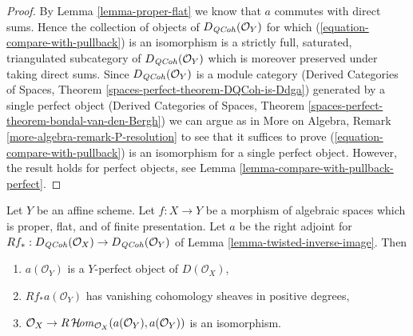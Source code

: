 \begin{proof}
By Lemma \ref{lemma-proper-flat} we know that $a$ commutes
with direct sums. Hence the collection of objects of
$D_{\mathit{QCoh}}(\mathcal{O}_Y)$ for which (\ref{equation-compare-with-pullback})
is an isomorphism is a strictly full, saturated, triangulated
subcategory of $D_{\mathit{QCoh}}(\mathcal{O}_Y)$ which is moreover
preserved under taking direct sums. Since $D_{\mathit{QCoh}}(\mathcal{O}_Y)$
is a module category (Derived Categories of Spaces, Theorem
\ref{spaces-perfect-theorem-DQCoh-is-Ddga}) generated by a single
perfect object (Derived Categories of Spaces, Theorem
\ref{spaces-perfect-theorem-bondal-van-den-Bergh})
we can argue as in
More on Algebra, Remark \ref{more-algebra-remark-P-resolution}
to see that it suffices to prove (\ref{equation-compare-with-pullback})
is an isomorphism for a single perfect object.
However, the result holds for perfect objects, see
Lemma \ref{lemma-compare-with-pullback-perfect}.
\end{proof}

\begin{lemma}
\label{lemma-properties-relative-dualizing}
Let $Y$ be an affine scheme. Let $f : X \to Y$ be a morphism of
algebraic spaces which is proper, flat, and of finite presentation.
Let $a$ be the right adjoint for
$Rf_* : D_{\mathit{QCoh}}(\mathcal{O}_X) \to D_{\mathit{QCoh}}(\mathcal{O}_Y)$ of
Lemma \ref{lemma-twisted-inverse-image}.
Then
\begin{enumerate}
\item $a(\mathcal{O}_Y)$ is a $Y$-perfect object of $D(\mathcal{O}_X)$,
\item $Rf_*a(\mathcal{O}_Y)$ has vanishing cohomology sheaves
in positive degrees,
\item $\mathcal{O}_X \to
R\mathop{\mathcal{H}\!\mathit{om}}\nolimits_{\mathcal{O}_X}(a(\mathcal{O}_Y), a(\mathcal{O}_Y))$
is an isomorphism.
\end{enumerate}
\end{lemma}

